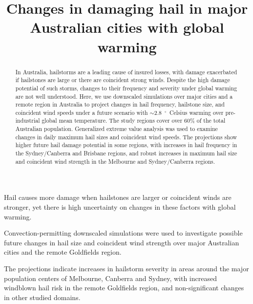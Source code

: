 \documentclass[]{agujournal2019}\usepackage[]{graphicx}\usepackage[]{xcolor}
\begin{document}
\title{Changes in damaging hail in major Australian cities with global warming}




\begin{keypoints}
\item Hail causes more damage when hailstones are larger or coincident winds are stronger, yet there is high uncertainty on changes in these factors with global warming.
\item Convection-permitting downscaled simulations were used to investigate possible future changes in hail size and coincident wind strength over major Australian cities and the remote Goldfields region.
\item The projections indicate increases in hailstorm severity in areas around the major population centers of Melbourne, Canberra and Sydney, with increased windblown hail risk in the remote Goldfields region, and non-significant changes in other studied domains.
\end{keypoints}

\begin{abstract} %
      In Australia, hailstorms are a leading cause of insured losses, with damage exacerbated if hailstones are large or there are coincident strong winds. Despite the high damage potential of such storms, changes to their frequency and severity under global warming are not well understood. Here, we use downscaled simulations over major cities and a remote region in Australia to project changes in hail frequency, hailstone size, and coincident wind speeds under a future scenario with $\sim$2.8~$^{\circ{}}$~Celsius warming over pre-industrial global mean temperature. The study regions cover over 60\% of the total Australian population. Generalized extreme value analysis was used to examine changes in daily maximum hail sizes and coincident wind speeds. The projections show higher future hail damage potential in some regions, with increases in hail frequency in the Sydney/Canberra and Brisbane regions, and robust increases in maximum hail size and coincident wind strength in the Melbourne and Sydney/Canberra regions.
\end{abstract}
\end{document}
